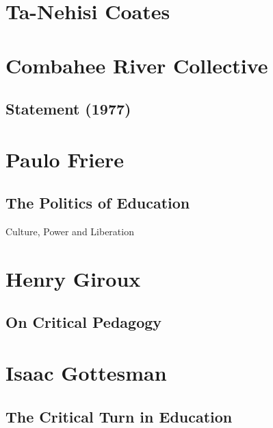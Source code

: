 \documentclass[10pt,titlepage]{book}
\begin{document}
\section{Ta-Nehisi Coates}

\subsection{\cite{coatestnh-bwm,coatestnh-wweyip}}

\section{Combahee River Collective}\label{Combahee}

\subsection{Statement (1977) \cite{combahee-statement}}

\section{Paulo Friere}\label{Friere}

\subsection{The Politics of Education \cite{friere-poled}}\label{Friere}

Culture, Power and Liberation

\section{Henry Giroux}\label{Giroux}

\subsection{On Critical Pedagogy \cite{giroux-critped}}

\pagebreak

\section{Isaac Gottesman}\label{Gottesman}

\subsection{The Critical Turn in Education \cite{gottesman-criturn}}
\end{document}

